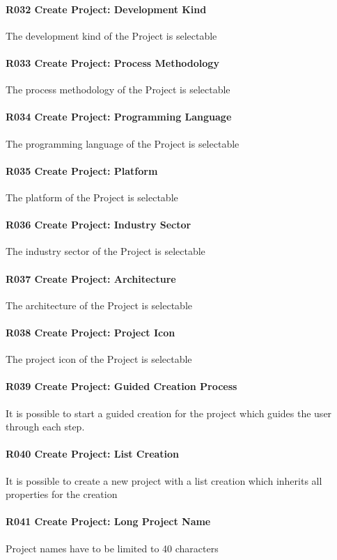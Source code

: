 \paragraph{R032 Create Project: Development Kind}
The development kind of the Project is selectable 
\paragraph{R033 Create Project: Process Methodology}
The process methodology of the Project is selectable 
\paragraph{R034 Create Project: Programming Language}
The programming language of the Project is selectable 
\paragraph{R035 Create Project: Platform}
The platform of the Project is selectable 
\paragraph{R036 Create Project: Industry Sector}
The industry sector of the Project is selectable 
\paragraph{R037 Create Project: Architecture}
The architecture of the Project is selectable 
\paragraph{R038 Create Project: Project Icon}
The project icon of the Project is selectable 
\paragraph{R039 Create Project: Guided Creation Process}
It is possible to start a guided creation for the project which guides the user through each step.
\paragraph{R040 Create Project: List Creation}
It is possible to create a new project with a list creation which inherits all properties for the creation
\paragraph{R041 Create Project: Long Project Name}
Project names have to be limited to 40 characters
